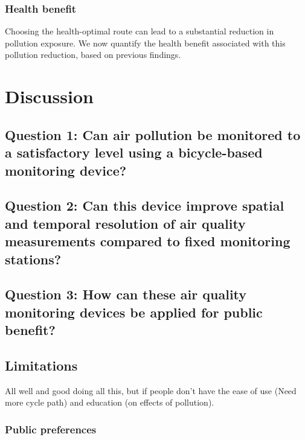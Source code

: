 \documentclass[11pt]{report}
\begin{document}
\subsection{Health benefit}


Choosing the health-optimal route can lead to a substantial reduction in pollution exposure. We now quantify the health benefit associated with this pollution reduction, based on previous findings.




\chapter{Discussion} \label{chap: discussion}

\section{Question 1: Can air pollution be monitored to a satisfactory level using a bicycle-based monitoring device?}

\section{Question 2: Can this device improve spatial and temporal resolution of air quality measurements compared to fixed monitoring stations?}

\section{Question 3: How can these air quality monitoring devices be applied for public benefit?}


\section{Limitations} \label{limitations}

All well and good doing all this, but if people don't have the ease of use (Need more cycle path) and education (on effects of pollution).

\subsection{Public preferences}
\end{document}
